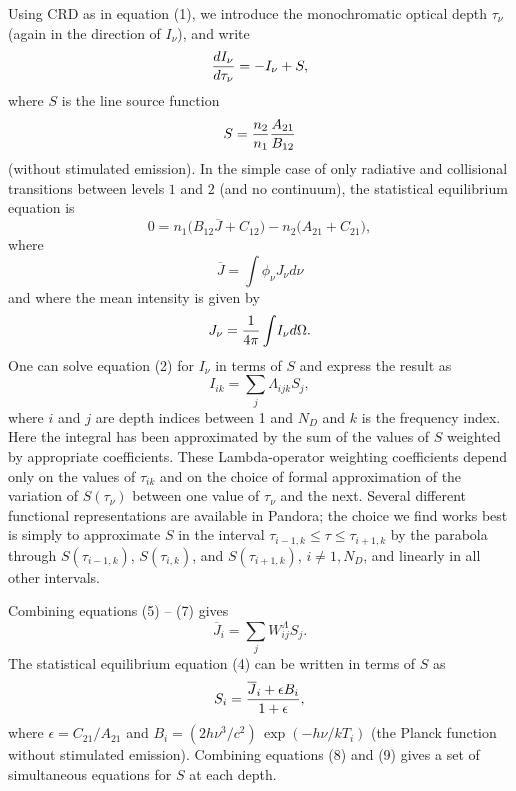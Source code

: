 \documentclass[11pt,twoside]{article}
\begin{document}
Using CRD as in equation (1), we introduce the monochromatic
optical depth $\tau_{\nu}$ (again in the direction of $I_{\nu}$),
and write
\begin{equation}
 {d I_{\nu} \over d \tau_{\nu}} = - I_{\nu} + S , 
\end{equation}
%
where $S$ is the line source function
\begin{equation}
 S = {n_2 \over n_1} {A_{21} \over B_{12}}  
\end{equation}
%
(without stimulated emission). In the simple case of
only radiative and collisional transitions between levels $1$
and $2$ (and no continuum), the statistical equilibrium equation is
\begin{equation}
 0 = n_1 \bigl(B_{12} {\overline J} + C_{12}\bigr) - 
n_2 \bigl(A_{21} + C_{21}\bigr) , 
\end{equation}
%
where
\begin{equation}
 {\overline J} = \int\! \phi_\nu J_\nu d\nu  
\end{equation}
%
and where the mean intensity is given by
\begin{equation}
 J_\nu = { 1 \over {4 \pi } } \int \! I_\nu d\Omega  .  
\end{equation}
%
One can solve equation (2) for $I_\nu$ in terms of $S$ and express
the result as
\begin{equation}
 I_{ik} = \sum_j \Lambda_{ijk} S_j  ,  
\end{equation}
%
where $i$ and $j$ are depth indices between 1 and $N_D$ and $k$ is the 
frequency index. Here the integral has been approximated by the sum of the
values of $S$ weighted by appropriate coefficients. These Lambda-operator
weighting coefficients depend only on the values of $\tau_{ik}$ and on the
choice of formal approximation of the variation of $S(\tau_\nu)$ between
one value of $\tau_\nu$ and the next. Several different functional
representations are available in Pandora; the choice we find works best
is simply to approximate $S$ in the interval $\tau_{i-1,k} \leq \tau \leq
\tau_{i+1,k}$ by the parabola through $S(\tau_{i-1,k})$, $S(\tau_{i,k})$,
and $S(\tau_{i+1,k})$, $i \neq 1, N_D$, and linearly in all other intervals.

Combining equations (5) -- (7) gives
\begin{equation}
 {\overline J}_i = \sum_j W_{ij}^\Lambda S_j  .  
\end{equation}
%
The statistical equilibrium equation (4) can be
written in terms of $S$ as
\begin{equation}
 S_i = {{{\overline J}_i + \epsilon B_i} \over {1 + \epsilon}}, 
\end{equation}
%
where $\epsilon = C_{21}/A_{21}$ and
$B_i = (2h{\nu^3}/c^2) \, \exp (-h{\nu}/kT_i)$
(the Planck function without stimulated emission). Combining
equations (8) and (9) gives a set of simultaneous equations
for $S$ at each depth.
\end{document}
